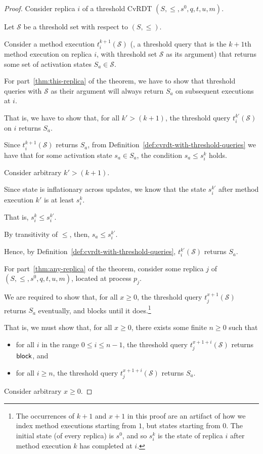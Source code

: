 \begin{proof}
  Consider replica $i$ of a threshold CvRDT $(S, \leq, s^0, q, t, u,
  m)$.

  Let $\mathcal{S}$ be a threshold set with respect to
  $(S, \leq)$.

  Consider a method execution $t^{k+1}_i(\mathcal{S})$ (\ie, a
  threshold query that is the $k+1$th method execution on replica $i$,
  with threshold set $\mathcal{S}$ as its argument) that returns some
  set of activation states $S_a \in \mathcal{S}$.

  For part~\ref{thm:this-replica} of the theorem, we have to show that
  threshold queries with $\mathcal{S}$ as their argument will always
  return $S_a$ on subsequent executions at $i$.

  That is, we have to show that, for all $k' > (k+1)$, the threshold
  query $t^{k'}_i(\mathcal{S})$ on $i$ returns $S_a$.

  Since $t^{k+1}_i(\mathcal{S})$ returns $S_a$, from
  Definition~\ref{def:cvrdt-with-threshold-queries} we have that for
  some activation state $s_a \in S_a$, the condition $s_a \leq s^k_i$
  holds.

  Consider arbitrary $k' > (k+1)$.

  Since state is inflationary across updates, we know that the state
  $s^{k'}_i$ after method execution $k'$ is at least $s^k_i$.

  That is, $s^k_i \leq s^{k'}_i$.

  By transitivity of $\leq$, then, $s_a \leq s^{k'}_i$.

  Hence, by Definition~\ref{def:cvrdt-with-threshold-queries},
  $t^{k'}_i(\mathcal{S})$ returns $S_a$.

  For part~\ref{thm:any-replica} of the theorem, consider some replica
  $j$ of $(S, \leq, s^0, q, t, u, m)$, located at process $p_j$.

  We are required to show that, for all $x \geq 0$, the threshold
  query $t^{x+1}_j(\mathcal{S})$ returns $S_a$ eventually, and blocks
  until it does.\footnote{The occurrences of $k+1$ and $x+1$ in this
    proof are an artifact of how we index method executions starting
    from $1$, but states starting from $0$.  The initial state (of
    every replica) is $s^0$, and so $s^k_i$ is the state of replica
    $i$ after method execution $k$ has completed at $i$.}

  That is, we must show that, for all $x \geq 0$, there exists some
  finite $n \geq 0$ such that
  \begin{itemize}
  \item 
    for all $i$ in the range $0 \leq i \leq n-1$, the threshold query
    $t^{x+1+i}_j(\mathcal{S})$ returns $\textsf{block}$, and
  \item
    for all $i \geq n$, the threshold query $t^{x+1+i}_j(\mathcal{S})$
    returns $S_a$.
  \end{itemize}
  Consider arbitrary $x \geq 0$.


\end{proof}
